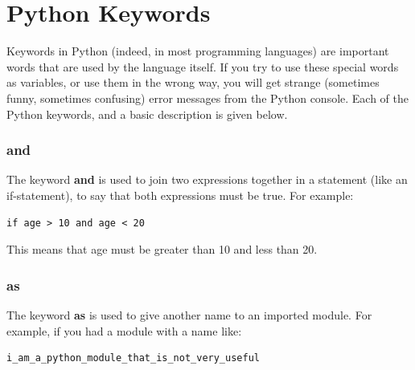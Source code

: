 
\chapter{Python Keywords}\label{app:pythonkeywords}

Keywords in Python (indeed, in most programming languages) are important words that are used by the language itself. If you try to use these special words as variables, or use them in the wrong way, you will get strange (sometimes funny, sometimes confusing) error messages from the Python console.  Each of the Python keywords, and a basic description is given below.

\subsection*{and}

The keyword \textbf{and} is used to join two expressions together in a statement (like an if-statement), to say that both expressions must be true.  For example:

\begin{listingignore}
\begin{verbatim}
if age > 10 and age < 20
\end{verbatim}
\end{listingignore}

\noindent
This means that age must be greater than 10 and less than 20.

\subsection*{as}

The keyword \textbf{as} is used to give another name to an imported module. For example, if you had a module with a name like:

\begin{listingignore}
\begin{verbatim}
i_am_a_python_module_that_is_not_very_useful
\end{verbatim}
\end{listingignore}

